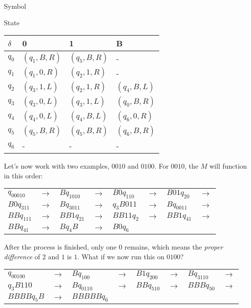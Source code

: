 \documentclass[12pt]{article}
\begin{document}
\begin{center}
Symbol

State
\begin{tabular}{ l  |  l l l }

$\delta$	& 0				& 1				& B			\\ \hline
$q_0$ 	& $(q_1,B,R)$		& $(q_5,B,R)$		& -			\\ 
$q_1$	& $(q_1,0,R)$		& $(q_2,1,R)$		& -			\\
$q_2$	& $(q_3,1,L)$		& $(q_2,1,R)$		& $(q_4,B,L) $	\\
$q_3$	& $(q_3,0,L)$		& $(q_3,1,L)$		& $(q_0,B,R) $	\\
$q_4$	& $(q_4,0,L)$		& $(q_4,B,L)$		& $(q_6,0,R) $	\\ 
$q_5$	& $(q_5,B,R)$		& $(q_5,B,R)$		& $(q_6,B,R) $	\\
$q_6$	& -				& -				& -			\\ 
    
\end{tabular}
\end{center}

Let's now work with two examples, $0010$ and $0100$. For $0010$, the $M$ will function in this order:

\begin{center}
\begin{tabular}{l l l l l l l l}

$q_00010$	& $\to$	& $Bq_1010$		& $\to$	& $B0q_110$		& $\to$	& $B01q_20$		&$\to$	\\
$B0q_311$	& $\to$	& $Bq_3011$		& $\to$	& $q_3B011$		& $\to$	& $Bq_0011$		&$\to$	\\
$BBq_111$	& $\to$	& $BB1q_21$		& $\to$	& $BB11q_2$		& $\to$	& $BB1q_41$		&$\to$	\\
$BBq_41$		& $\to$	& $Bq_4B$		& $\to$	& $B0q_6$		& 		&				&		\\

\end{tabular}
\end{center}

\noindent After the process is finished, only one $0$ remains, which means the \textit{proper difference} of $2$ and $1$ is $1$. What if we now run this on $0100$?

\begin{center}
\begin{tabular}{l l l l l l l l}

$q_00100$	& $\to$	& $Bq_100$		& $\to$	& $B1q_200$		& $\to$	& $Bq_3110$		&$\to$	\\
$q_3B110$	& $\to$	& $Bq_0110$		& $\to$	& $BBq_510$		& $\to$	& $BBBq_50$		&$\to$	\\
$BBBBq_5B$	& $\to$	& $BBBBBq_6$	&		&				&		& 				&		\\

\end{tabular}
\end{center}
\end{document}
